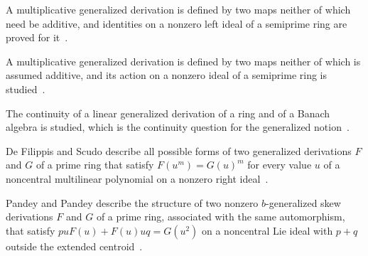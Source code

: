 A multiplicative generalized derivation is defined by two maps neither of which need be additive, and identities on a nonzero left ideal of a semiprime ring are proved for it~\cite{WlSomeIdentitiesRelated2023}.

A multiplicative generalized derivation is defined by two maps neither of which is assumed additive, and its action on a nonzero ideal of a semiprime ring is studied~\cite{WlMultiplicativeGeneralizedD2018}.

The continuity of a linear generalized derivation of a ring and of a Banach algebra is studied, which is the continuity question for the generalized notion~\cite{WlOnContinuousLinearGeneralizedD2021}.

De Filippis and Scudo describe all possible forms of two generalized derivations $F$ and $G$ of a prime ring that satisfy $F(u^m)=G(u)^m$ for every value $u$ of a noncentral multilinear polynomial on a nonzero right ideal~\cite{WlGeneralizedDerivationsWhichExt2015}.

Pandey and Pandey describe the structure of two nonzero $b$-generalized skew derivations $F$ and $G$ of a prime ring, associated with the same automorphism, that satisfy $p u F(u)+F(u) u q=G(u^2)$ on a noncentral Lie ideal with $p+q$ outside the extended centroid~\cite{WlACharacterizationOfBGeneralize2023}.

